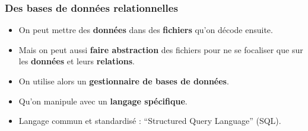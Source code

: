 \subsubsection{Des bases de données relationnelles}
\begin{slide}
	\begin{itemize}
		\item On peut mettre des \textbf{données} dans des \textbf{fichiers} qu'on décode ensuite.
		\item Mais on peut aussi \textbf{faire abstraction} des fichiers pour ne se focaliser que sur les \textbf{données} et leurs \textbf{relations}.
	\end{itemize}
\end{slide}

\begin{slide}
	\begin{itemize}
		\item On utilise alors un \textbf{gestionnaire de bases de données}.
		\item Qu'on manipule avec un \textbf{langage spécifique}.
		\item Langage commun et standardisé : \enquote{Structured Query Language} (SQL).
	\end{itemize}
\end{slide}


